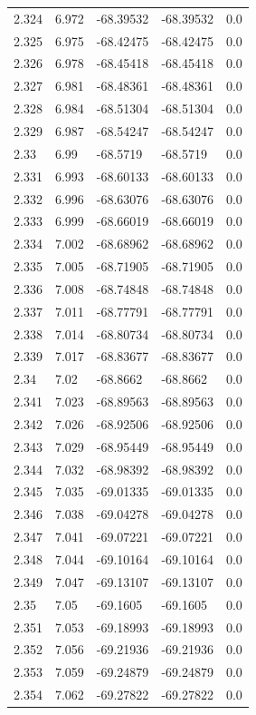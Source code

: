 \begin{tabular}{lllll}
2.324 & 6.972 & -68.39532 & -68.39532 & 0.0 \\
2.325 & 6.975 & -68.42475 & -68.42475 & 0.0 \\
2.326 & 6.978 & -68.45418 & -68.45418 & 0.0 \\
2.327 & 6.981 & -68.48361 & -68.48361 & 0.0 \\
2.328 & 6.984 & -68.51304 & -68.51304 & 0.0 \\
2.329 & 6.987 & -68.54247 & -68.54247 & 0.0 \\
2.33 & 6.99 & -68.5719 & -68.5719 & 0.0 \\
2.331 & 6.993 & -68.60133 & -68.60133 & 0.0 \\
2.332 & 6.996 & -68.63076 & -68.63076 & 0.0 \\
2.333 & 6.999 & -68.66019 & -68.66019 & 0.0 \\
2.334 & 7.002 & -68.68962 & -68.68962 & 0.0 \\
2.335 & 7.005 & -68.71905 & -68.71905 & 0.0 \\
2.336 & 7.008 & -68.74848 & -68.74848 & 0.0 \\
2.337 & 7.011 & -68.77791 & -68.77791 & 0.0 \\
2.338 & 7.014 & -68.80734 & -68.80734 & 0.0 \\
2.339 & 7.017 & -68.83677 & -68.83677 & 0.0 \\
2.34 & 7.02 & -68.8662 & -68.8662 & 0.0 \\
2.341 & 7.023 & -68.89563 & -68.89563 & 0.0 \\
2.342 & 7.026 & -68.92506 & -68.92506 & 0.0 \\
2.343 & 7.029 & -68.95449 & -68.95449 & 0.0 \\
2.344 & 7.032 & -68.98392 & -68.98392 & 0.0 \\
2.345 & 7.035 & -69.01335 & -69.01335 & 0.0 \\
2.346 & 7.038 & -69.04278 & -69.04278 & 0.0 \\
2.347 & 7.041 & -69.07221 & -69.07221 & 0.0 \\
2.348 & 7.044 & -69.10164 & -69.10164 & 0.0 \\
2.349 & 7.047 & -69.13107 & -69.13107 & 0.0 \\
2.35 & 7.05 & -69.1605 & -69.1605 & 0.0 \\
2.351 & 7.053 & -69.18993 & -69.18993 & 0.0 \\
2.352 & 7.056 & -69.21936 & -69.21936 & 0.0 \\
2.353 & 7.059 & -69.24879 & -69.24879 & 0.0 \\
2.354 & 7.062 & -69.27822 & -69.27822 & 0.0 \\

\end{tabular}
